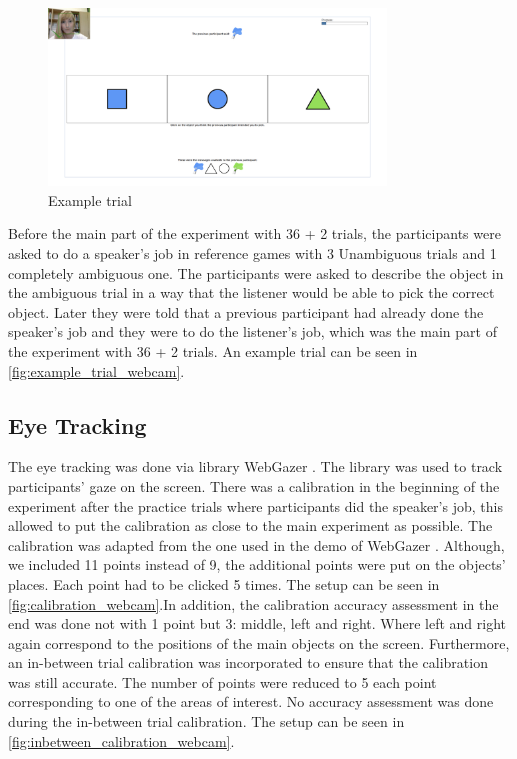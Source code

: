 \begin{figure}
    \centering
    \includegraphics[width=0.8\textwidth]{images/example_trial_webcam.png}
    \caption{Example trial}
    \label{fig:example_trial_webcam}
\end{figure}

Before the main part of the experiment with 36 + 2 trials, the participants were asked to do a speaker's job in reference games with 3 Unambiguous trials and 1 completely ambiguous one. The participants were asked to describe the object in the ambiguous trial in a way that the listener would be able to pick the correct object. Later they were told that a previous participant had already done the speaker's job and they were to do the listener's job, which was the main part of the experiment with 36 + 2 trials. An example trial can be seen in \autoref{fig:example_trial_webcam}.

\subsection{Eye Tracking}
\label{sec:data:eyetr}
The eye tracking was done via library WebGazer \cite{wegbazer}. The library was used to track participants' gaze on the screen. There was a calibration in the beginning of the experiment after the practice trials where participants did the speaker's job, this allowed to put the calibration as close to the main experiment as possible. The calibration was adapted from the one used in the demo of WebGazer \cite{wegbazer}. Although, we included 11 points instead of 9, the additional points were put on the objects' places. Each point had to be clicked 5 times. The setup can be seen in \autoref{fig:calibration_webcam}.In addition, the calibration accuracy assessment in the end was done not with 1 point but 3: middle, left and right. Where left and right again correspond to the positions of the main objects on the screen. Furthermore, an in-between trial calibration was incorporated to ensure that the calibration was still accurate. The number of points were reduced to 5 each point corresponding to one of the areas of interest. No accuracy assessment was done during the in-between trial calibration. The setup can be seen in \autoref{fig:inbetween_calibration_webcam}.

